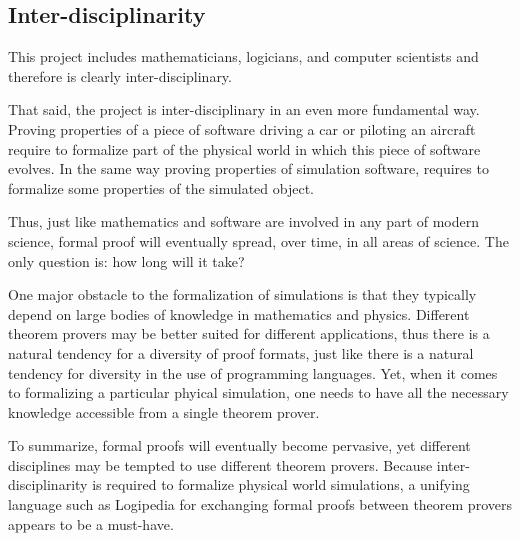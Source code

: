 \subsection{Inter-disciplinarity}
This project includes mathematicians, logicians, and computer
scientists and therefore is clearly inter-disciplinary.

That said, the project is inter-disciplinary in an even more fundamental
way. Proving properties of a piece of software driving a car or
piloting an aircraft require to formalize part of the physical world
in which this piece of software evolves. In the same way proving
properties of simulation software, requires to formalize some
properties of the simulated object.

Thus, just like mathematics and software are involved in any part of
modern science, formal proof will eventually spread, over time, in all
areas of science. The only question is: how long will it take?

One major obstacle to the formalization of simulations is that they
typically depend on large bodies of knowledge in mathematics and physics.
Different theorem provers may be better suited for different applications,
thus there is a natural tendency for a diversity of proof formats, just
like there is a natural tendency for diversity in the use of programming
languages.
Yet, when it comes to formalizing a particular phyical simulation, one needs
to have all the necessary knowledge accessible from a single theorem prover.

To summarize, formal proofs will eventually become pervasive, yet
different disciplines may be tempted to use different theorem provers.
Because inter-disciplinarity is required to formalize physical world simulations,
a unifying language such as Logipedia for exchanging formal proofs between
theorem provers appears to be a must-have.



